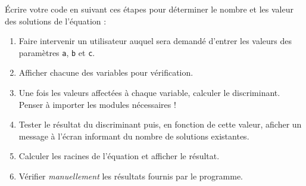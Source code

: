 Écrire votre code en suivant ces étapes pour déterminer le
nombre et les valeur des solutions de l'équation :
\begin{enumerate}

\item Faire intervenir un utilisateur auquel sera demandé d'entrer
  les valeurs des paramètres \texttt{a}, \texttt{b} et \texttt{c}.
\item Afficher chacune des variables pour vérification.
\item  Une fois  les  valeurs affectées à chaque variable, calculer  le
  discriminant.\\ Penser à importer les modules nécessaires !
\item  Tester le  résultat du  discriminant  puis, en  fonction de  cette
  valeur, aficher un  message à l'écran informant du nombre
  de solutions existantes.
\item Calculer  les racines de l'équation et afficher le résultat.
\item Vérifier \emph{manuellement} les résultats fournis par le programme.

\end{enumerate}
